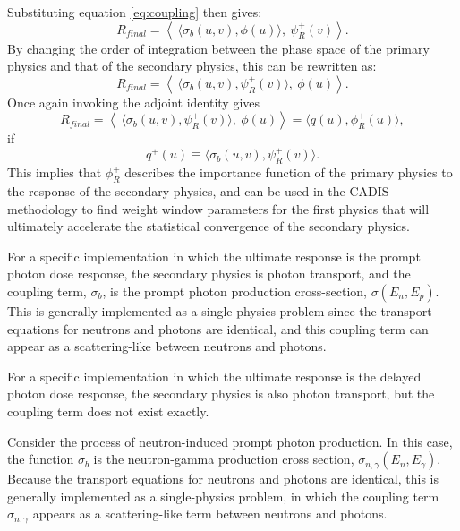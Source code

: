 Substituting equation \ref{eq:coupling} then gives:
\begin{equation}
  R_{final} = \left \langle\  \langle \sigma_b(u,v) , \phi(u) \rangle,\  \psi_R^{+}(v) \right\rangle.
\end{equation}
By changing the order of integration between the phase space of the primary
physics and that of the secondary physics, this can be rewritten as:
\begin{equation}\label{eq:pseudo-response}
  R_{final} = \left \langle \ \langle \sigma_b(u,v) , \psi_R^{+}(v) \rangle,\  \phi(u) \right\rangle.
\end{equation}
Once again invoking the adjoint identity gives
\begin{equation}
  R_{final} = \left \langle \ \langle \sigma_b(u,v) , \psi_R^{+}(v) \rangle,\  \phi(u) \right\rangle = \langle q(u), \phi_R^{+}(u) \rangle,
\end{equation}
if
\begin{equation}
  q^{+}(u) \equiv \langle \sigma_b(u,v) , \psi_R^{+}(v) \rangle.
\end{equation}
This implies that $\phi_R^{+}$ describes the importance function of the
primary physics to the response of the secondary physics, and can be used in
the CADIS methodology to find weight window parameters for the first physics
that will ultimately accelerate the statistical convergence of the secondary
physics.

For a specific implementation in which the ultimate response is the prompt
photon dose response, the secondary physics is photon transport, and the
coupling term, $\sigma_b$, is the prompt photon production cross-section,
$\sigma(E_n,E_p)$.  This is generally implemented as a single physics problem
since the transport equations for neutrons and photons are identical, and this
coupling term can appear as a scattering-like between neutrons and photons.

For a specific implementation in which the ultimate response is the delayed
photon dose response, the secondary physics is also photon transport, but the
coupling term does not exist exactly.  

Consider the process of neutron-induced prompt photon production.
In this case, the function $\sigma_b$ is the neutron-gamma production
cross section, $\sigma_{n,\gamma}(E_n,E_\gamma)$.  Because the transport
equations for neutrons and photons are identical, this is generally
implemented as a single-physics problem, in which the coupling term
$\sigma_{n,\gamma}$ appears as a scattering-like term between neutrons
and photons.

